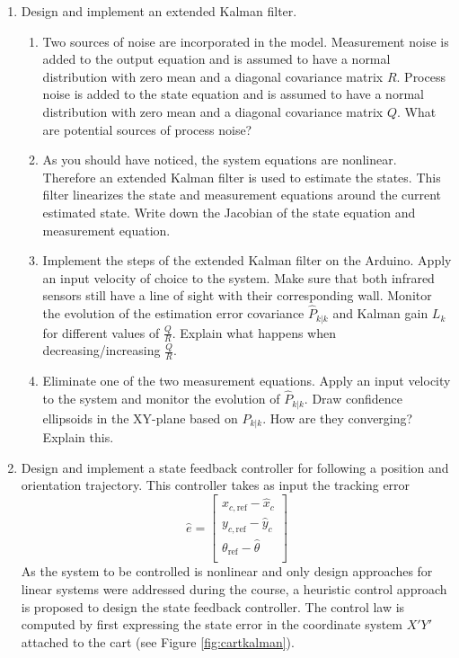 \documentclass[10pt,a4paper]{article}
\begin{document}
\begin{enumerate}
  \item Design and implement an extended Kalman filter.
  \begin{enumerate}
    \item Two sources of noise are incorporated in the model. Measurement noise is added to the output equation and is assumed to have a normal distribution with zero mean and a diagonal covariance matrix $R$. Process noise is added to the state equation and is assumed to have a normal distribution with zero mean and a diagonal covariance matrix $Q$. What are potential sources of process noise?
    \item As you should have noticed, the system equations are nonlinear. Therefore an extended Kalman filter is used to estimate the states. This filter linearizes the state and measurement equations around the current estimated state. Write down the Jacobian of the state equation and measurement equation.
    \item Implement the steps of the extended Kalman filter on the Arduino. Apply an input velocity of choice to the system. Make sure that both infrared sensors still have a line of sight with their corresponding wall.
    Monitor the evolution of the estimation error covariance $\hat{P}_{k|k}$ and Kalman gain $L_k$ for different values of $\frac{Q}{R}$. Explain what happens when decreasing/increasing $\frac{Q}{R}$.
    \item Eliminate one of the two measurement equations. Apply an input velocity to the system and monitor the evolution of $\hat{P}_{k|k}$. Draw confidence ellipsoids in the XY-plane based on $\hat{P}_{k|k}$. How are they converging? Explain this.
  \end{enumerate}
  \item Design and implement a state feedback controller for following a position and orientation trajectory. This controller takes as input the tracking error
  \begin{equation}
  \hat{e} = \begin{bmatrix}
  x_{c,\text{ref}}-\hat{x}_c\\
  y_{c,\text{ref}}-\hat{y}_c\\
  \theta_{\text{ref}}-\hat{\theta}\\
  \end{bmatrix}
  \end{equation}
  As the system to be controlled is nonlinear and only design approaches for linear systems were addressed during the course, a heuristic control approach is proposed to design the state feedback controller. The control law is computed by first expressing the state error in the coordinate system $X'Y'$ attached to the cart (see Figure \ref{fig:cartkalman}).

\end{enumerate}
\end{document}
